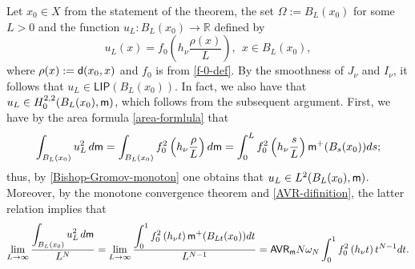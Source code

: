\documentclass[11pt, reqno]{amsart}
\newcommand{\ds}{\displaystyle}
\numberwithin{equation}{section}
\begin{document}
		
		
		
		
		
		Let $x_0\in X$ from the statement of the theorem,  the set $\Omega:=B_L(x_0)$ for some $L>0$ and  the function $u_L:B_L(x_0)\to \mathbb R$ defined  by
		$$u_L(x)=f_0\left(h_\nu\frac{\rho(x)}{L}\right),\ \ x\in B_L(x_0),$$
		where $\rho(x):={\sf d}(x_0,x)$ and $f_0$ is from \eqref{f-0-def}. By the smoothness of $J_\nu$ and $I_\nu$, it follows that $u_L\in \mathsf{LIP}(B_L(x_0))$. In fact, we also have that $u_L\in H_0^{2,2}(B_L(x_0),{\sf m})$, which follows from the subsequent argument. First, we have by the area formula \eqref{area-formlula} that
		$$\int_{B_L(x_0)}u_L^2\,{\rm d}{\sf m}=\int_{B_L(x_0)}f_0^2\left(h_\nu\frac{\rho}{L}\right){\rm d}{\sf m}=\int_0^Lf_0^2\left(h_\nu\frac{s}{L}\right){\sf m}^+(B_s(x_0)){\rm d}s;$$  
		thus, by \eqref{Bishop-Gromov-monoton} one obtains that $u_L\in L^2(B_L(x_0),{\sf m})$. Moreover, by the monotone convergence theorem and \eqref{AVR-difinition}, the latter relation implies that \begin{equation}\label{first-limit}
			\lim_{L\to \infty}\frac{\ds\int_{B_L(x_0)}u_L^2\,{\rm d}{\sf m}}{L^N}	=\lim_{L\to \infty}\frac{\ds\int_0^1f_0^2\left(h_\nu t\right){\sf m}^+(B_{Lt}(x_0)){\rm d}t}{L^{N-1}}={\sf AVR}_ {\sf m}N\omega_N\int_0^1f_0^2\left(h_\nu t\right)t^{N-1}{\rm d}t.
		\end{equation}
		
\end{document}
